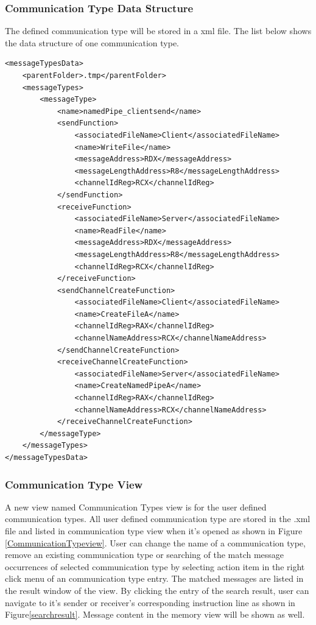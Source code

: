 \documentclass[paper=a4, fontsize=11pt]{scrartcl}
\numberwithin{equation}{section}		%
\numberwithin{figure}{section}			%
\numberwithin{table}{section}				%
\begin{document}
\subsubsection{Communication Type Data Structure}
The defined communication type will be stored in a xml file. The list below shows the data structure of one communication type. 
\begin{lstlisting}
<messageTypesData>
    <parentFolder>.tmp</parentFolder>
    <messageTypes>
        <messageType>
            <name>namedPipe_clientsend</name>
            <sendFunction>
                <associatedFileName>Client</associatedFileName>
                <name>WriteFile</name>
                <messageAddress>RDX</messageAddress>
                <messageLengthAddress>R8</messageLengthAddress>
                <channelIdReg>RCX</channelIdReg>
            </sendFunction>
            <receiveFunction>
                <associatedFileName>Server</associatedFileName>
                <name>ReadFile</name>
                <messageAddress>RDX</messageAddress>
                <messageLengthAddress>R8</messageLengthAddress>
                <channelIdReg>RCX</channelIdReg>
            </receiveFunction>
            <sendChannelCreateFunction>
                <associatedFileName>Client</associatedFileName>
                <name>CreateFileA</name>
                <channelIdReg>RAX</channelIdReg>
                <channelNameAddress>RCX</channelNameAddress>
            </sendChannelCreateFunction>
            <receiveChannelCreateFunction>
                <associatedFileName>Server</associatedFileName>
                <name>CreateNamedPipeA</name>
                <channelIdReg>RAX</channelIdReg>
                <channelNameAddress>RCX</channelNameAddress>
            </receiveChannelCreateFunction>
        </messageType>
    </messageTypes>
</messageTypesData>
\end{lstlisting}


\subsubsection{Communication Type View}
A new view named Communication Types view is for the user defined communication types. All user defined communication type are stored in the .xml file and listed in communication type view when it's opened as shown in Figure \ref{CommunicationTypeview}. User can change the name of a communication type, remove an existing communication type or searching of the match message occurrences of selected communication type by selecting action item in the right click menu of an communication type entry. The matched messages are listed in the result window of the view. By clicking the entry of the search  result, user can navigate to it's sender or receiver's corresponding instruction line as shown in Figure\ref{searchresult}. Message content in the memory view will be shown as well.
\end{document}

